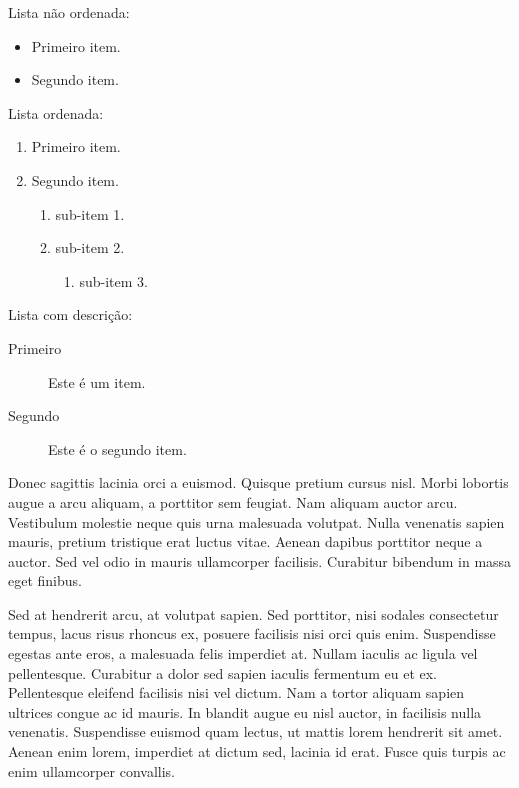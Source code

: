 \documentclass{article}
\begin{document}
	Lista não ordenada:
	
	\begin{itemize}
		\item Primeiro item.
		\item Segundo item.
	\end{itemize}
	
	Lista ordenada:
	
	\begin{enumerate}
		\item Primeiro item.
		\item Segundo item.
		\begin{enumerate}
			\item sub-item 1.
			\item sub-item 2.
			\begin{enumerate}
				\item sub-item 3.
			\end{enumerate}
		\end{enumerate}
	\end{enumerate}
	
	Lista com descrição:
	
	\begin{description}
		\item[Primeiro] Este é um item.
		\item[Segundo] Este é o segundo item.
	\end{description}
	
	Donec sagittis lacinia orci a euismod. Quisque pretium cursus nisl. Morbi lobortis augue a arcu aliquam, a porttitor sem feugiat. Nam aliquam auctor arcu. Vestibulum molestie neque quis urna malesuada volutpat. Nulla venenatis sapien mauris, pretium tristique erat luctus vitae. Aenean dapibus porttitor neque a auctor. Sed vel odio in mauris ullamcorper facilisis. Curabitur bibendum in massa eget finibus.
	
	Sed at hendrerit arcu, at volutpat sapien. Sed porttitor, nisi sodales consectetur tempus, lacus risus rhoncus ex, posuere facilisis nisi orci quis enim. Suspendisse egestas ante eros, a malesuada felis imperdiet at. Nullam iaculis ac ligula vel pellentesque. Curabitur a dolor sed sapien iaculis fermentum eu et ex. Pellentesque eleifend facilisis nisi vel dictum. Nam a tortor aliquam sapien ultrices congue ac id mauris. In blandit augue eu nisl auctor, in facilisis nulla venenatis. Suspendisse euismod quam lectus, ut mattis lorem hendrerit sit amet. Aenean enim lorem, imperdiet at dictum sed, lacinia id erat. Fusce quis turpis ac enim ullamcorper convallis.
	
\end{document}
